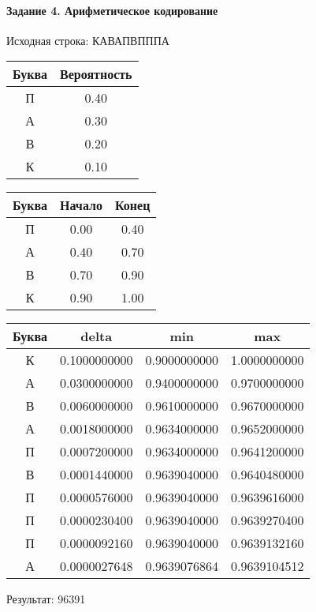 \documentclass[a4paper, 12pt]{article}
\begin{document}
\paragraph{Задание 4. Арифметическое кодирование\\}

Исходная строка: КАВАПВПППА\
\begin{center}
 \begin{tabular}{ |c|c| } 
  \hline
     Буква & Вероятность \\ \hline
П & 0.40\\\hline
А & 0.30\\\hline
В & 0.20\\\hline
К & 0.10
\\ \hline \end{tabular}
\end{center}
\begin{center}
 \begin{tabular}{ |c|c|c| } 
  \hline
     Буква & Начало & Конец \\ \hline
П & 0.00 & 0.40\\\hline
А & 0.40 & 0.70\\\hline
В & 0.70 & 0.90\\\hline
К & 0.90 & 1.00
\\ \hline \end{tabular}
\end{center}
\begin{center}
 \begin{tabular}{ |c|c|c|c| } 
  \hline
     Буква & delta & min & max \\ \hline
К & 0.1000000000 & 0.9000000000 & 1.0000000000\\\hline
А & 0.0300000000 & 0.9400000000 & 0.9700000000\\\hline
В & 0.0060000000 & 0.9610000000 & 0.9670000000\\\hline
А & 0.0018000000 & 0.9634000000 & 0.9652000000\\\hline
П & 0.0007200000 & 0.9634000000 & 0.9641200000\\\hline
В & 0.0001440000 & 0.9639040000 & 0.9640480000\\\hline
П & 0.0000576000 & 0.9639040000 & 0.9639616000\\\hline
П & 0.0000230400 & 0.9639040000 & 0.9639270400\\\hline
П & 0.0000092160 & 0.9639040000 & 0.9639132160\\\hline
А & 0.0000027648 & 0.9639076864 & 0.9639104512
\\ \hline \end{tabular}
\end{center}
Результат: 96391
\pagebreak
\end{document}
